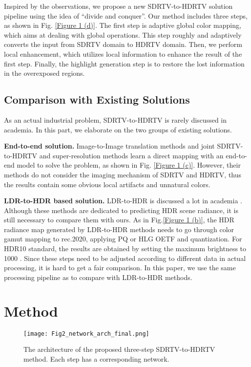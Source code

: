 \documentclass[10pt,twocolumn,letterpaper]{article}
\begin{document}
Inspired by the observations, we propose a new SDRTV-to-HDRTV solution pipeline using the idea of ``divide and conquer''. Our method includes three steps, as shown in Fig. \ref{Figure 1 (d)}. The first step is adaptive global color mapping, which aims at dealing with global operations. This step roughly and adaptively converts the input from SDRTV domain to HDRTV domain. Then, we perform local enhancement, which utilizes local information to enhance the result of the first step. Finally, the highlight generation step is to restore the lost information in the overexposed regions. 
\subsection{Comparison with Existing Solutions}
\label{Comparison with existing solutions}
As an actual industrial problem, SDRTV-to-HDRTV is rarely discussed in academia. In this part, we elaborate on the two groups of existing solutions.

\textbf{End-to-end solution.} Image-to-Image translation methods \cite{isola2017image, zhu2017unpaired} and joint SDRTV-to-HDRTV and super-resolution methods \cite{kim2019deep, kim2020jsi} learn a direct mapping with an end-to-end model to solve the problem, as shown in Fig. \ref{Figure 1 (c)}. However, their methods do not consider the imaging mechanism of SDRTV and HDRTV, thus the results contain some obvious local artifacts and unnatural colors.

\textbf{LDR-to-HDR based solution.} LDR-to-HDR is discussed a lot in academia \cite{rempel2007ldr2hdr, banterle2006inverse, masia2017}. Although these methods are dedicated to predicting HDR scene radiance, it is still necessary to compare them with ours. As in Fig.\ref{Figure 1 (b)}, the HDR radiance map generated by LDR-to-HDR methods needs to go through color gamut mapping to rec.2020, applying PQ or HLG OETF and quantization. For HDR10 standard, the results are obtained by setting the maximum brightness to 1000 . Since these steps need to be adjusted according to different data in actual processing, it is hard to get a fair comparison. In this paper, we use the same processing pipeline as \cite{kim2019deep, kim2020jsi} to compare with LDR-to-HDR methods.
\vspace{-4pt}
\section{Method}
\begin{figure*}[!t]
   \begin{center}
\texttt{[image: Fig2\_network\_arch\_final.png]}
   \end{center}
   \vspace{-8pt}
      \caption{The architecture of the proposed three-step SDRTV-to-HDRTV method. Each step has a corresponding network.}
     \vspace{-7pt}
   \label{Figure 2 architecture of three-step SDR-to-HDR}
   \end{figure*}
\end{document}

